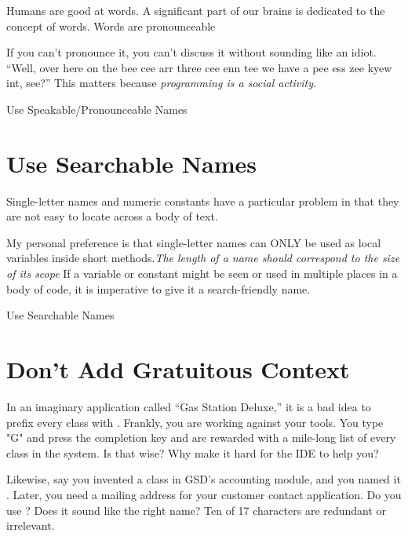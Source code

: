 \begin{remark}
Humans are good at words. A significant part of our brains is dedicated to the concept of words. Words are pronounceable
\end{remark}

If you can't pronounce it, you can't discuss it without sounding like an idiot. “Well, over here on the bee cee arr three cee enn tee we have a pee ess zee kyew int, see?” This matters because \textit{programming is a social activity}.

\begin{marker}
Use Speakable/Pronounceable Names
\end{marker}

\section{Use Searchable Names}

Single-letter names and numeric constants have a particular problem in that they are not easy to locate across a body of text.

My personal preference is that single-letter names can ONLY be used as local variables inside short methods.\textit{The length of a name should correspond to the size of its scope} If a variable or constant might be seen or used in multiple places in a body of code, it is imperative to give it a search-friendly name.

\begin{marker}
Use Searchable Names
\end{marker}

\section{Don't Add Gratuitous Context}

In an imaginary application called “Gas Station Deluxe,” it is a bad idea to prefix every class with . Frankly, you are working against your tools. You type "G" and press the completion key and are rewarded with a mile-long list of every class in the system. Is that wise? Why make it hard for the IDE to help you?

Likewise, say you invented a  class in GSD's accounting module, and you named it . Later, you need a mailing address for your customer contact application. Do you use ? Does it sound like the right name? Ten of 17 characters are redundant or irrelevant.

